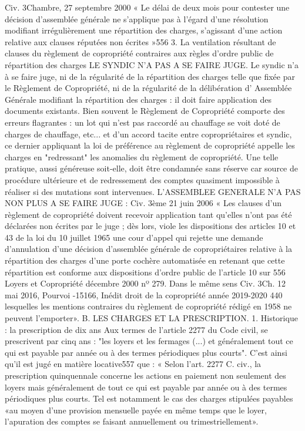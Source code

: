 Civ. 3\degres Chambre, 27 septembre 2000
« Le délai de deux mois pour contester une décision d'assemblée générale ne s'applique pas à l'égard d'une résolution modifiant irrégulièrement une répartition des charges, s'agissant d'une action relative aux clauses réputées non écrites »556
3. La ventilation résultant de clauses du règlement de copropriété contraires aux règles d’ordre public de répartition des charges
LE SYNDIC N’A PAS A SE FAIRE JUGE.
Le syndic n'a à se faire juge, ni de la régularité de la répartition des charges telle que fixée par le Règlement de Copropriété, ni de la régularité de la délibération d' Assemblée Générale modifiant la répartition des charges : il doit faire application des documents existants.
Bien souvent le Règlement de Copropriété comporte des erreurs flagrantes : un lot qui n'est pas raccordé au chauffage se voit doté de charges de chauffage, etc... et d'un accord tacite entre copropriétaires et syndic, ce dernier appliquant la loi de préférence au règlement de copropriété appelle les charges en "redressant" les anomalies du règlement de copropriété.
Une telle pratique, aussi généreuse soit-elle, doit être condamnée sans réserve car source de procédure ultérieure et de redressement des comptes quasiment impossible à réaliser si des mutations sont intervenues.
L’ASSEMBLEE GENERALE N’A PAS NON PLUS A SE FAIRE JUGE :
Civ. 3ème 21 juin 2006
« Les clauses d'un règlement de copropriété doivent recevoir application tant qu'elles n'ont pas été déclarées non écrites par le juge ; dès lors, viole les dispositions des articles 10 et 43 de la loi du 10 juillet 1965 une cour d'appel qui rejette une demande d'annulation d'une décision d'assemblée générale de copropriétaires relative à la répartition des charges d'une porte cochère automatisée en retenant que cette répartition est conforme aux dispositions d'ordre public de l'article 10 sur
556 Loyers et Copropriété décembre 2000 nº 279. Dans le même sens Civ. 3\degres Ch. 12 mai 2016, Pourvoi -15166, Inédit
droit de la copropriété année 2019-2020
440
lesquelles les mentions contraires du règlement de copropriété rédigé en 1958 ne peuvent l'emporter».
B. LES CHARGES ET LA PRESCRIPTION.
1. Historique : la prescription de dix ans
Aux termes de l'article 2277 du Code civil, se prescrivent par cinq ans :
"les loyers et les fermages (...) et généralement tout ce qui est payable par année ou à des termes périodiques plus courts".
C’est ainsi qu’il est jugé en matière locative557 que :
« Selon l'art. 2277 C. civ., la prescription quinquennale concerne les actions en paiement non seulement des loyers mais généralement de tout ce qui est payable par année ou à des termes périodiques plus courts. Tel est notamment le cas des charges stipulées payables «au moyen d'une provision mensuelle payée en même temps que le loyer, l'apuration des comptes se faisant annuellement ou trimestriellement».
